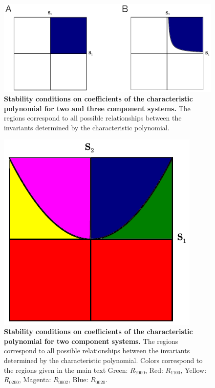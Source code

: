 \begin{figure}[!ht]
\centering
\noindent\includegraphics[width=0.7\columnwidth]{fig/region2and3.pdf}
\caption{{\bf Stability conditions on coefficients of the characteristic polynomial for two and three component systems.} The regions correspond to all possible relationships between the invariants determined by the characteristic polynomial.}
\label{fig:region2and3}
\end{figure}

\pagebreak

\begin{figure}[!ht]
\centering
\noindent\includegraphics[width=0.5\columnwidth]{fig/region2x2.pdf}
\caption{{\bf Stability conditions on coefficients of the characteristic polynomial for two component systems.} The regions correspond to all possible relationships between the invariants determined by the characteristic polynomial. Colors correspond to the regions given in the main text Green: $R_{2000}$, Red: $R_{1100}$, Yellow: $R_{0200}$, Magenta: $R_{0002}$, Blue: $R_{0020}$.}
\label{fig:region2x2}
\end{figure}

\pagebreak

